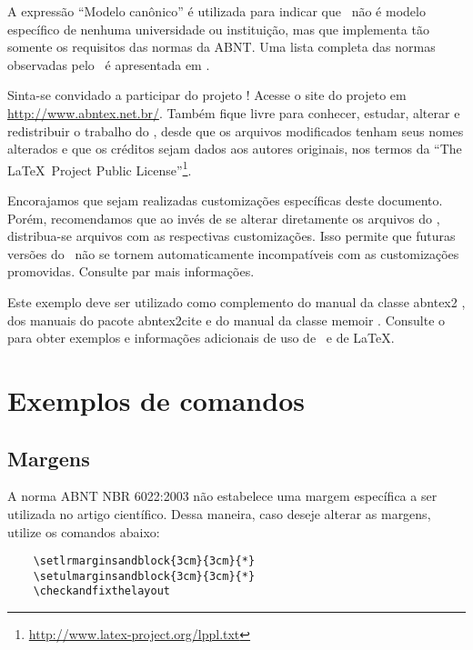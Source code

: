 \documentclass[
article,			%
11pt,				%
oneside,			%
a4paper,			%
english,			%
brazil,				%
sumario=tradicional
]{/usr/local/share/texmf/tex/latex/abntex2/abntex2}
\begin{document}
	A expressão ``Modelo canônico'' é utilizada para indicar que \abnTeX\ não é
	modelo específico de nenhuma universidade ou instituição, mas que implementa tão
	somente os requisitos das normas da ABNT. Uma lista completa das normas
	observadas pelo \abnTeX\ é apresentada em .
	
	Sinta-se convidado a participar do projeto \abnTeX! Acesse o site do projeto em
	\url{http://www.abntex.net.br/}. Também fique livre para conhecer,
	estudar, alterar e redistribuir o trabalho do \abnTeX, desde que os arquivos
	modificados tenham seus nomes alterados e que os créditos sejam dados aos
	autores originais, nos termos da ``The \LaTeX\ Project Public
	License''\footnote{\url{http://www.latex-project.org/lppl.txt}}.
	
	Encorajamos que sejam realizadas customizações específicas deste documento.
	Porém, recomendamos que ao invés de se alterar diretamente os arquivos do
	\abnTeX, distribua-se arquivos com as respectivas customizações. Isso permite
	que futuras versões do \abnTeX~não se tornem automaticamente incompatíveis com
	as customizações promovidas. Consulte 
	par mais informações.
	
	Este exemplo deve ser utilizado como complemento do manual da classe
	\textsf{abntex2} \cite{abntex2classe}, dos manuais do pacote
	\textsf{abntex2cite} \cite{abntex2cite,abntex2cite-alf} e do manual da classe
	\textsf{memoir} \cite{memoir}. Consulte o  para obter
	exemplos e informações adicionais de uso de \abnTeX\ e de \LaTeX.
	
	\section{Exemplos de comandos}
	
	\subsection{Margens}
	
	A norma ABNT NBR 6022:2003 não estabelece uma margem específica a ser utilizada
	no artigo científico. Dessa maneira, caso deseje alterar as margens, utilize os
	comandos abaixo:
	
	\begin{verbatim}
	\setlrmarginsandblock{3cm}{3cm}{*}
	\setulmarginsandblock{3cm}{3cm}{*}
	\checkandfixthelayout
	\end{verbatim}
	
\end{document}
